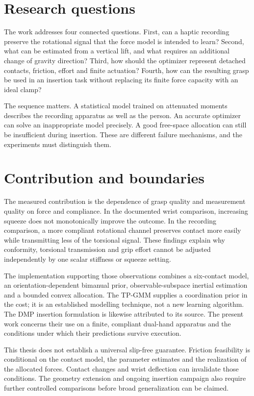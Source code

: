 \section{Research questions}

The work addresses four connected questions. First, can a haptic recording preserve the rotational signal that the force model is intended to learn? Second, what can be estimated from a vertical lift, and what requires an additional change of gravity direction? Third, how should the optimizer represent detached contacts, friction, effort and finite actuation? Fourth, how can the resulting grasp be used in an insertion task without replacing its finite force capacity with an ideal clamp?

The sequence matters. A statistical model trained on attenuated moments describes the recording apparatus as well as the person. An accurate optimizer can solve an inappropriate model precisely. A good free-space allocation can still be insufficient during insertion. These are different failure mechanisms, and the experiments must distinguish them.

\section{Contribution and boundaries}

The measured contribution is the dependence of grasp quality and measurement quality on force and compliance. In the documented wrist comparison, increasing squeeze does not monotonically improve the outcome. In the recording comparison, a more compliant rotational channel preserves contact more easily while transmitting less of the torsional signal. These findings explain why conformity, torsional transmission and grip effort cannot be adjusted independently by one scalar stiffness or squeeze setting.

The implementation supporting those observations combines a six-contact model, an orientation-dependent bimanual prior, observable-subspace inertial estimation and a bounded convex allocation. The TP-GMM supplies a coordination prior in the cost; it is an established modelling technique, not a new learning algorithm. The DMP insertion formulation is likewise attributed to its source. The present work concerns their use on a finite, compliant dual-hand apparatus and the conditions under which their predictions survive execution.

This thesis does not establish a universal slip-free guarantee. Friction feasibility is conditional on the contact model, the parameter estimates and the realization of the allocated forces. Contact changes and wrist deflection can invalidate those conditions. The geometry extension and ongoing insertion campaign also require further controlled comparisons before broad generalization can be claimed.

